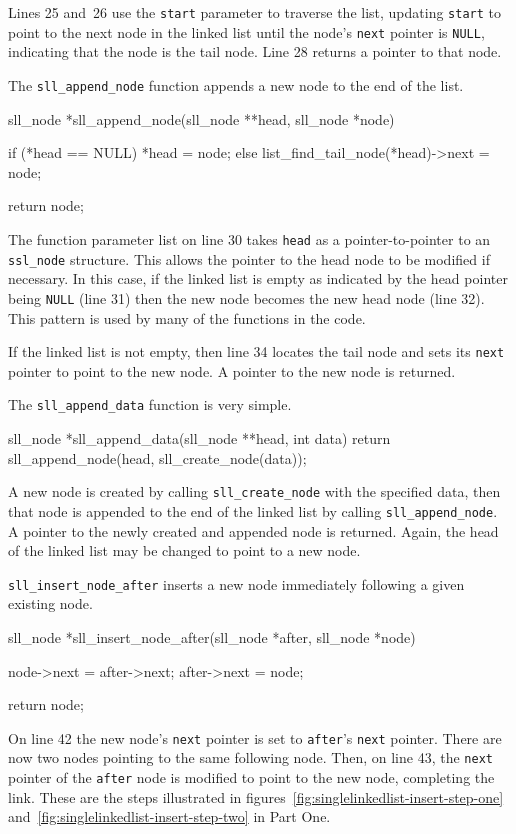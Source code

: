 \documentclass{article}
\begin{document}
  Lines 25 and~26 use the \verb|start| parameter to traverse the list, updating \verb|start| to point to the next node in the linked list until the node's \verb|next| pointer is \verb|NULL|, indicating that the node is the tail node. Line 28 returns a pointer to that node.

  The \verb|sll_append_node| function appends a new node to the end of the list.
  \begin{lstc}
sll_node *sll_append_node(sll_node **head, sll_node *node) {
  if (*head == NULL)
    *head = node;
  else
    list_find_tail_node(*head)->next = node;

  return node;
}\end{lstc}
  The function parameter list on line 30 takes \verb|head| as a pointer-to-pointer to an \verb|ssl_node| structure. This allows the pointer to the head node to be modified if necessary. In this case, if the linked list is empty as indicated by the head pointer being \verb|NULL| (line 31) then the new node becomes the new head node (line 32). This pattern is used by many of the functions in the code.

  If the linked list is not empty, then line 34 locates the tail node and sets its \verb|next| pointer to point to the new node. A pointer to the new node is returned.

  The \verb|sll_append_data| function is very simple.
  \begin{lstc}
sll_node *sll_append_data(sll_node **head, int data) {
  return sll_append_node(head, sll_create_node(data));
}\end{lstc}
  A new node is created by calling \verb|sll_create_node| with the specified data, then that node is appended to the end of the linked list by calling \verb|sll_append_node|. A pointer to the newly created and appended node is returned. Again, the head of the linked list may be changed to point to a new node.

  \verb|sll_insert_node_after| inserts a new node immediately following a given existing node.
  \begin{lstc}
sll_node *sll_insert_node_after(sll_node *after, sll_node *node) {
  node->next = after->next;
  after->next = node;

  return node;
}\end{lstc}
  On line 42 the new node's \verb|next| pointer is set to \verb|after|'s \verb|next| pointer. There are now two nodes pointing to the same following node. Then, on line 43, the \verb|next| pointer of the \verb|after| node is modified to point to the new node, completing the link. These are the steps illustrated in figures~\ref{fig:singlelinkedlist-insert-step-one} and~\ref{fig:singlelinkedlist-insert-step-two} in Part One.
\end{document}
